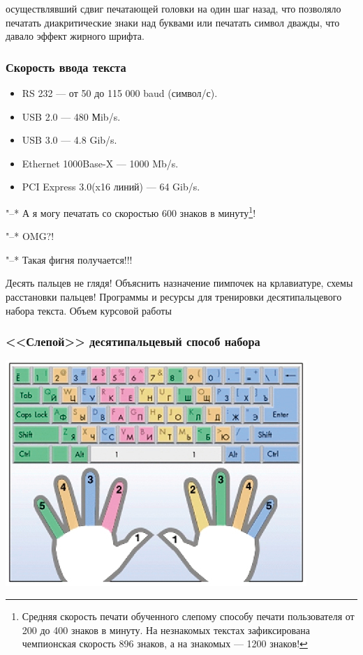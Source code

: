 осуществлявший сдвиг печатающей головки на один шаг назад, что позволяло печатать диакритические знаки над буквами или печатать символ дважды, что давало эффект жирного шрифта.

\begin{frame}
    \frametitle{Скорость ввода текста}

    \begin{itemize}
        \item RS 232 --- от 50 до 115 000 baud (символ/с).
        \item USB 2.0 --- 480 Мib/s.
        \item USB 3.0 --- 4.8 Gib/s.
        \item Ethernet 1000Base-X --- 1000 Mb/s.
        \item PCI Express 3.0(x16 линий) --- 64 Gib/s.
    \end{itemize}

    \begin{block}{}
        "--* А я могу печатать со скоростью 600 знаков в минуту\footnote{Средняя скорость печати обученного слепому способу печати пользователя от 200 до 400 знаков в минуту. На незнакомых текстах зафиксирована чемпионская скорость 896 знаков, а на знакомых --- 1200 знаков!}!

        "--* OMG?!

        "--* Такая фигня получается!!!
    \end{block}
\end{frame}

Десять пальцев не глядя! Объяснить назначение пимпочек на крлавиатуре, схемы расстановки пальцев! Программы и ресурсы для тренировки десятипальцевого набора текста. Объем курсовой работы

\begin{frame}
    \frametitle{<<Слепой>> десятипальцевый способ набора}
    
    \begin{center}
        \includegraphics[width=.8\textwidth]{fig/tenfingers}
    \end{center}
\end{frame}


